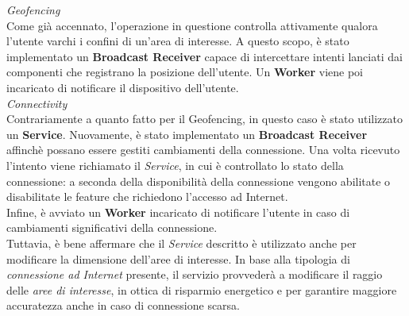 \documentclass{article}
\begin{document}
    \textit{Geofencing} \\
    Come già accennato, l'operazione in questione controlla attivamente qualora l'utente varchi i confini di un'area di interesse. A questo scopo, è stato implementato un \textbf{Broadcast Receiver} capace di intercettare intenti lanciati dai componenti che registrano la posizione dell'utente. Un \textbf{Worker} viene poi incaricato di notificare il dispositivo dell'utente.\vspace*{7pt}\\
    \textit{Connectivity} \\
    Contrariamente a quanto fatto per il Geofencing, in questo caso è stato utilizzato un \textbf{Service}. Nuovamente, è stato implementato un \textbf{Broadcast Receiver} affinchè possano essere gestiti cambiamenti della connessione. Una volta ricevuto l'intento viene richiamato il \textit{Service}, in cui è controllato lo stato della connessione: a seconda della disponibilità della connessione vengono abilitate o disabilitate le feature che richiedono l'accesso ad Internet.\\
    Infine, è avviato un \textbf{Worker} incaricato di notificare l'utente in caso di cambiamenti significativi della connessione. \vspace*{7pt}\\
    Tuttavia, è bene affermare che il \textit{Service} descritto è utilizzato anche per modificare la dimensione dell'aree di interesse. In base alla tipologia di \textit{connessione ad Internet} presente, il servizio provvederà a modificare il raggio delle \textit{aree di interesse}, in ottica di risparmio energetico e per garantire maggiore accuratezza anche in caso di connessione scarsa.
\end{document}
